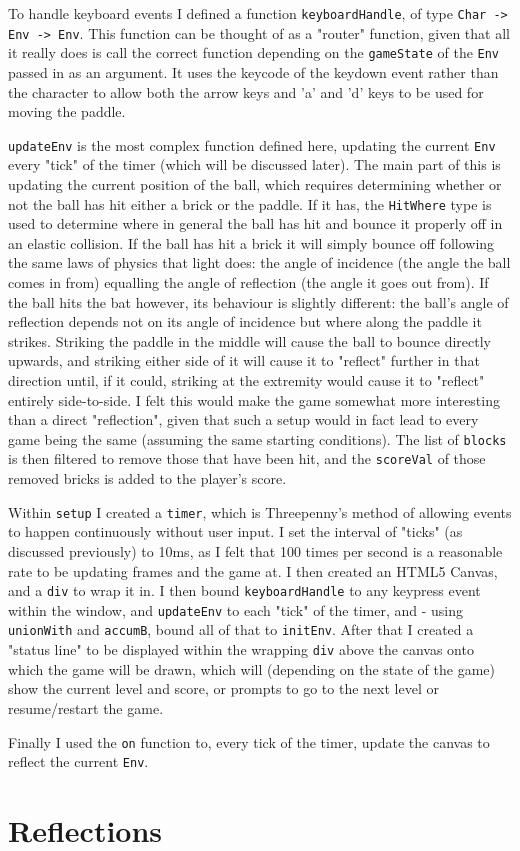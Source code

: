 \documentclass[12pt]{article}
\begin{document}
To handle keyboard events I defined a function \verb|keyboardHandle|, of type \verb|Char -> Env -> Env|.
This function can be thought of as a "router" function, given that all it really does is call the correct function depending on the \verb|gameState| of the \verb|Env| passed in as an argument.
It uses the keycode of the keydown event rather than the character to allow both the arrow keys and 'a' and 'd' keys to be used for moving the paddle.

\par

\verb|updateEnv| is the most complex function defined here, updating the current \verb|Env| every "tick" of the timer (which will be discussed later).
The main part of this is updating the current position of the ball, which requires determining whether or not the ball has hit either a brick or the paddle.
If it has, the \verb|HitWhere| type is used to determine where in general the ball has hit and bounce it properly off in an elastic collision.
If the ball has hit a brick it will simply bounce off following the same laws of physics that light does: the angle of incidence (the angle the ball comes in from) equalling the angle of reflection (the angle it goes out from).
If the ball hits the bat however, its behaviour is slightly different: the ball's angle of reflection depends not on its angle of incidence but where along the paddle it strikes.
Striking the paddle in the middle will cause the ball to bounce directly upwards, and striking either side of it will cause it to "reflect" further in that direction until, if it could, striking at the extremity would cause it to "reflect" entirely side-to-side.
I felt this would make the game somewhat more interesting than a direct "reflection", given that such a setup would in fact lead to every game being the same (assuming the same starting conditions).
The list of \verb|blocks| is then filtered to remove those that have been hit, and the \verb|scoreVal| of those removed bricks is added to the player's score.

\par

Within \verb|setup| I created a \verb|timer|, which is Threepenny's method of allowing events to happen continuously without user input.
I set the interval of "ticks" (as discussed previously) to 10ms, as I felt that 100 times per second is a reasonable rate to be updating frames and the game at.
I then created an HTML5 Canvas, and a \verb|div| to wrap it in.
I then bound \verb|keyboardHandle| to any keypress event within the window, and \verb|updateEnv| to each "tick" of the timer, and - using \verb|unionWith| and \verb|accumB|, bound all of that to \verb|initEnv|.
After that I created a "status line" to be displayed within the wrapping \verb|div| above the canvas onto which the game will be drawn, which will (depending on the state of the game) show the current level and score, or prompts to go to the next level or resume/restart the game.

\par

Finally I used the \verb|on| function to, every tick of the timer, update the canvas to reflect the current \verb|Env|.

\section{Reflections}
\end{document}
